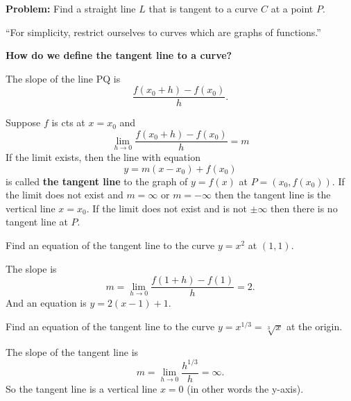 \documentclass[../calc1-main.tex]{subfiles}
\begin{document}
  \textbf{Problem:} Find a straight line $L$ that is tangent to a curve $C$ at a point $P$.

  \textsf{``For simplicity, restrict ourselves to curves which are graphs of functions.''}

  \textbf{How do we define the tangent line to a curve?}
  \begin{figure}[H]
    \centering
    
  \end{figure}

  The slope of the line PQ is
  \[
    \dfrac{f(x_0 + h) - f(x_0)}{h}.
  \]

  \begin{definition}
    Suppose $f$ is cts at $x=x_0$ and
    \[
      \lim_{h \to 0} \dfrac{f(x_0 + h) - f(x_0)}{h} = m
    \]
    If the limit exists, then the line with equation
    \[
      y = m(x - x_0) + f(x_0)
    \]
    is called \textbf{the tangent line} to the graph of $y=f(x)$ at $P = (x_0, f(x_0))$.
    If the limit does not exist and $m = \infty$ or $m = -\infty$ then the tangent line is the vertical line $x=x_0$.
    If the limit does not exist and is not $\pm \infty$ then there is no tangent line at $P$.
  \end{definition}

  \begin{example}
    Find an equation of the tangent line to the curve $y = x^2$ at $(1, 1)$.
  \end{example}
  \begin{solution}
    The slope is
    \[
      m = \lim_{h \to 0} \dfrac{f(1+h)-f(1)}{h} = 2.
    \]
    And an equation is $y=2(x-1)+1$.
  \end{solution}
  \begin{example}
    Find an equation of the tangent line to the curve $y = x^{1/3} = \sqrt[3]{x}$ at the origin.
  \end{example}
  \begin{solution}
    The slope of the tangent line is
    \[
      m = \lim_{h \to 0} \dfrac{h^{1/3}}{h} = \infty.
    \]
    So the tangent line is a vertical line $x=0$ (in other words the y-axis).
    \begin{figure}[H]
      \centering
      
    \end{figure}
  \end{solution}
\end{document}
